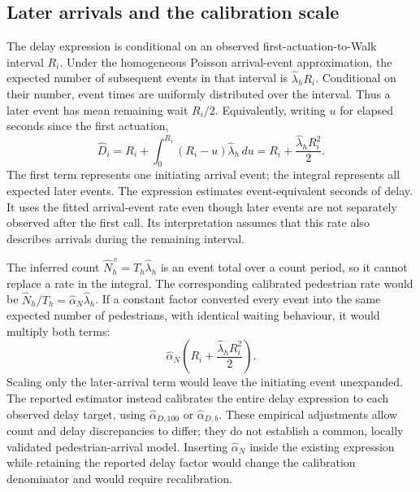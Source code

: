 \documentclass[11pt]{article}
\begin{document}
\subsection*{Later arrivals and the calibration scale}

The delay expression is conditional on an observed first-actuation-to-Walk interval $R_i$. Under the homogeneous Poisson arrival-event approximation, the expected number of subsequent events in that interval is $\widehat\lambda_h R_i$. Conditional on their number, event times are uniformly distributed over the interval. Thus a later event has mean remaining wait $R_i/2$. Equivalently, writing $u$ for elapsed seconds since the first actuation,
\begin{equation}
\widehat D_i
=R_i+\int_0^{R_i}(R_i-u)\widehat\lambda_h\,du
=R_i+\frac{\widehat\lambda_hR_i^2}{2}.
\label{eq:si-delay-derivation}
\end{equation}
The first term represents one initiating arrival event; the integral represents all expected later events. The expression estimates event-equivalent seconds of delay. It uses the fitted arrival-event rate even though later events are not separately observed after the first call. Its interpretation assumes that this rate also describes arrivals during the remaining interval.

The inferred count $\widehat N_h^{\,e}=T_h\widehat\lambda_h$ is an event total over a count period, so it cannot replace a rate in the integral. The corresponding calibrated pedestrian rate would be $\widehat N_h/T_h=\widehat\alpha_N\widehat\lambda_h$. If a constant factor converted every event into the same expected number of pedestrians, with identical waiting behaviour, it would multiply both terms:
\begin{equation}
\widehat\alpha_N\left(R_i+\frac{\widehat\lambda_hR_i^2}{2}\right).
\end{equation}
Scaling only the later-arrival term would leave the initiating event unexpanded. The reported estimator instead calibrates the entire delay expression to each observed delay target, using $\widehat\alpha_{D,100}$ or $\widehat\alpha_{D,b}$. These empirical adjustments allow count and delay discrepancies to differ; they do not establish a common, locally validated pedestrian-arrival model. Inserting $\widehat\alpha_N$ inside the existing expression while retaining the reported delay factor would change the calibration denominator and would require recalibration.
\end{document}
